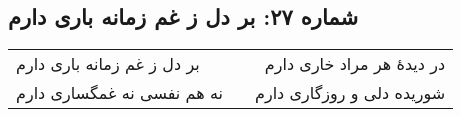 \begin{center}
\section*{شماره ۲۷: بر دل ز غم زمانه باری دارم}
\label{sec:027}
\begin{longtable}{l p{0.5cm} r}
بر دل ز غم زمانه باری دارم
&&
در دیدهٔ هر مراد خاری دارم
\\
نه هم نفسی نه غمگساری دارم
&&
شوریده دلی و روزگاری دارم
\\
\end{longtable}
\end{center}
